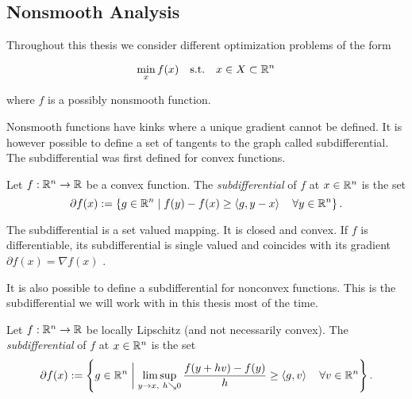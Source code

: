 

\subsection{Nonsmooth Analysis}

Throughout this thesis we consider different optimization problems of the form

\begin{equation*}
\min_{x} f(x) \quad \text{s.t.} \quad x \in X \subset \mathbb{R}^n
\label{min_prob}
\end{equation*}

where \(f\) is a possibly nonsmooth function.


Nonsmooth functions have kinks where a unique gradient cannot be defined. It is however possible to define a set of tangents to the graph called subdifferential.
The subdifferential was first defined for convex functions.

\begin{definition}
\label{conv_subdiff}
	Let \(f: \mathbb{R}^n \to \mathbb{R} \) be a convex function. The \emph{subdifferential} of \(f\) at \(x\in \mathbb{R}^n\) is the set 
	\[ \partial f(x) := \left\{g \in \mathbb{R}^n \mid f(y)-f(x) \geq \left\langle g,y-x \right\rangle \quad \forall y \in \mathbb{R}^n \right\}. \]
\end{definition}

The subdifferential is a set valued mapping. It is closed and convex. If \(f\) is differentiable, its subdifferential is single valued and coincides with its gradient \(\partial f(x) = {\nabla f(x)}\) \cite{Rockafellar1970}.


It is also possible to define a subdifferential for nonconvex functions. This is the subdifferential we will work with in this thesis most of the time.

\begin{definition}
\label{nonconv_subdiff}
	Let \(f: \mathbb{R}^n \to \mathbb{R}\) be locally Lipschitz (and not necessarily convex).
	The \emph{subdifferential} of \(f\) at \(x \in \mathbb{R}^n\) is the set
\[ \partial f(x) := \left\{g \in \mathbb{R}^n \biggm| \limsup_{y \to x,~ h \searrow 0}\frac{f(y+hv)-f(y)}{h} \geq \left\langle g, v\right\rangle \quad \forall v \in \mathbb{R}^n \right\}. \]
\end{definition} 

